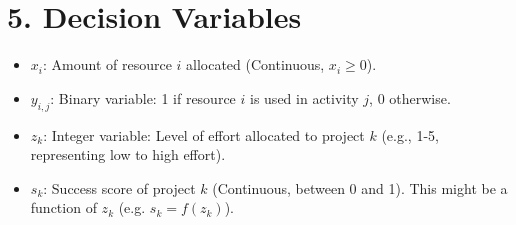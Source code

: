 \documentclass{article}
\begin{document}
\section{5. Decision Variables}
\begin{itemize}
    \item $x_i$: Amount of resource $i$ allocated (Continuous, $x_i \ge 0$).
    \item $y_{i,j}$: Binary variable: 1 if resource $i$ is used in activity $j$, 0 otherwise.
    \item $z_k$:  Integer variable: Level of effort allocated to project $k$ (e.g., 1-5, representing low to high effort).
    \item $s_k$: Success score of project $k$ (Continuous, between 0 and 1).  This might be a function of $z_k$ (e.g.  $s_k = f(z_k)$).
\end{itemize}
\end{document}
